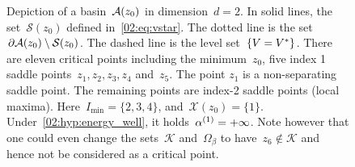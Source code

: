     \begin{figure}
        \center
    \caption[An energy basin for a typical Morse function]{Depiction of a basin~$\mathcal{A}(z_0)$ in dimension~$d=2$. In solid lines, the set~$\mathcal S(z_0)$ defined in~\eqref{02:eq:vstar}. The dotted line is the set~$\partial\mathcal{A}(z_0)\setminus\mathcal S(z_0)$. The dashed line is the level set~$\{V=V^*\}$. There are eleven critical points including the minimum~$z_0$, five index 1 saddle points~$z_1,z_2,z_3,z_4$ and~$z_5$. The point $z_1$ is a non-separating saddle point. The remaining points are index-2 saddle points (local maxima). Here~$I_{\min}=\{2,3,4\}$, and~$\mathcal X(z_0)=\{1\}$. Under~\eqref{02:hyp:energy_well}, it holds~$\alpha^{(1)}=+\infty$. Note however that one could even change the sets~$\mathcal K$ and~$\Omega_\beta$ to have~$z_6\not\in\mathcal K$ and hence not be considered as a critical point.}
    \label{02:fig:basin}    
    \end{figure}


